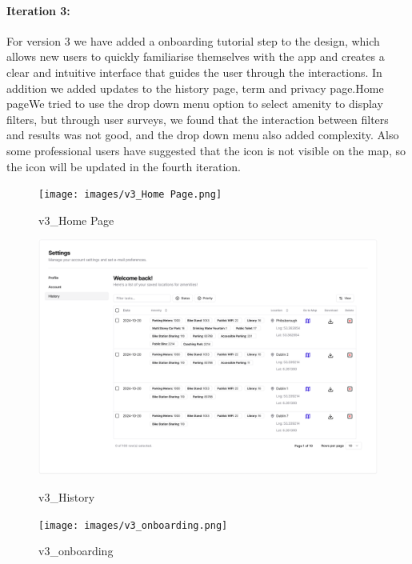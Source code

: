 \paragraph{Iteration 3:}
For version 3 we have added a onboarding tutorial step to the design, which allows new users to quickly familiarise themselves with the app and creates a clear and intuitive interface that guides the user through the interactions. In addition we added updates to the history page, term and privacy page.Home pageWe tried to use the drop down menu option to select amenity to display filters, but through user surveys, we found that the interaction between filters and results was not good, and the drop down menu also added complexity. Also some professional users have suggested that the icon is not visible on the map, so the icon will be updated in the fourth iteration.
\begin{figure}[h]
    \centering
    \begin{minipage}{0.32\textwidth}
        \centering
        \texttt{[image: images/v3\_Home Page.png]}
        \caption{v3_Home Page}
        \label{fig:v3_Home Page}
    \end{minipage}
    \hfill
    \begin{minipage}{0.32\textwidth}
        \centering
        \includegraphics[width=\textwidth]{images/v3_History.png}
        \caption{v3_History}
        \label{fig:v3_History}
    \end{minipage}
    \hfill
    \begin{minipage}{0.32\textwidth}
        \centering
        \texttt{[image: images/v3\_onboarding.png]}
        \caption{v3_onboarding}
        \label{fig:v3_onboarding}
    \end{minipage}

\end{figure}



